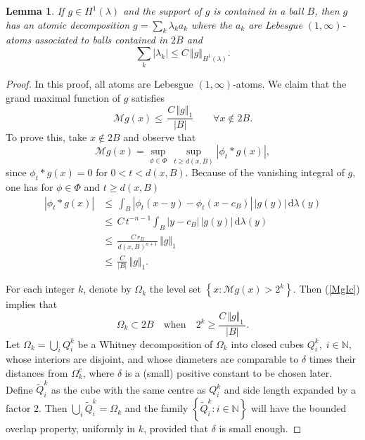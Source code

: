 \documentclass{amsart}                 %
\newtheorem{lemma}[theorem]{Lemma}
\numberwithin{equation}{section}
\newcommand\set[1]{{\left\{#1\right\}}}
\renewcommand\mod[1]{\left\vert{#1}\right\vert}
\newcommand\norm[2]{{\Vert{#1}\Vert_{#2}}}
\newcommand\wrt{\,\mathrm{d}}
\newcommand\1{{\bf 1}}
\newcommand\BN{\mathbb{N}}
\newcommand\cM{\mathcal{M}}  \newcommand\fM{\mathfrak{M}}
\begin{document}
\begin{lemma}\label{cptsupp}
If $g\in H^1(\lambda)$  and the support of $g$ is contained in a ball $B$, 
then $g$ has an atomic decomposition $g=\sum_k\lambda_k a_k$ 
where the $a_k$ are Lebesgue  $(1,\infty)$-atoms associated to balls
contained in $2B$ and 
\begin{equation}\label{ne}
\sum_k \mod{\lambda_k}\le C\,\norm{g}{H^1(\lambda)}.
\end{equation}
\end{lemma}
\begin{proof} 
In this proof, all atoms are Lebesgue  $(1,\infty)$-atoms.
We claim that  the grand maximal function of $g$ satisfies 
\begin{equation}\label{MgIc}
\cM g(x)\le\,\frac{C\,\norm{g}{1}}{\mod{B}}\qquad\forall x\notin 2B.
\end{equation}
To prove this, take $x \notin 2B$ and observe that
$$
\cM g(x) =\sup_{\phi\in\Phi}\, \sup_{t\ge d(x,B)}\mod{\phi_t*g(x)},
$$
since $\phi_t*g(x)=0$ for $0<t < d(x,B)$. Because of the vanishing
integral of $g$, one has for $\phi\in \Phi$ and $t \ge d(x,B)$
\begin{align*}
\mod{\phi_t*g(x)}&\le \,\int_{B}\mod{\phi_t(x-y)-\phi_t(x-c_B)}\,\mod{g
(y)} \wrt\lambda(y)
\\ 
& \le\,C\,t^{-n-1}\int_{B}\mod{y-c_{B}}\,\mod{g(y)}\wrt\lambda(y)\\ 
&\le\, \frac{C\,r_{B}}{d(x,B)^{n+1}}\, \norm{g}{1}\\
&\le\, \frac{C
 }{\mod{B}}\, \norm{g}{1}.
\end{align*}
\par
 For each integer $k$, denote by $\Omega_k$ the level set $\set{x: 
\cM g(x)>2^k}$. 
 Then (\ref{MgIc}) implies that 
\begin{equation}\label{hi}
 \Omega_k\subset 2B \quad \textrm{when}\quad  2^k \ge \frac{C\,
\norm{g}{1}\,}{ \mod{B}}.
\end{equation}
Let $\Omega_k=\bigcup_i Q^k_i$ be a Whitney decomposition of $
\Omega_k$  into closed cubes $Q^k_i, \; i \in \BN$, whose interiors are disjoint, 
and whose diameters are comparable to $\delta$ times their distances 
from $\Omega_k^c$, where $\delta$ is a (small) positive constant to 
be chosen later. Define $\tilde{Q}_i^k$ as the cube with the same centre 
as $Q_i^k$ and side length expanded by a factor $2$. Then $\bigcup_i\tilde{Q}^k_i=
\Omega_k$ and the family $\set{\tilde{Q}^k_i: i\in \BN}$ will have the 
bounded overlap property, uniformly in $k$, provided that $\delta$ is small enough. 

\end{proof}
\end{document}
